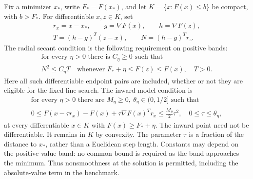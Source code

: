 Fix a minimizer $x_*$, write $F_*=F(x_*)$, and let
$K=\{x:F(x)\le b\}$ be compact, with $b>F_*$. For differentiable $x,z\in K$,
set
\[
 \begin{gathered}
 r_x=x-x_*,\qquad g=\nabla F(x),\qquad h=\nabla F(z),\\
 T=(h-g)^T(z-x),\qquad N=(h-g)^Tr_z.
 \end{gathered}
\]
The radial secant condition is the following requirement on positive bands:
\begin{equation}\label{art:radial-condition}
 \begin{gathered}
 \text{for every }\eta>0\text{ there is }C_\eta\ge0\text{ such that}\\
 N^2\le C_\eta T
 \quad\text{whenever }F_*+\eta\le F(z)\le F(x),\quad T>0.
 \end{gathered}
\end{equation}
Here all such differentiable endpoint pairs are included, whether or not they
are eligible for the fixed line search. The inward model condition is
\begin{equation}\label{art:inward-condition}
 \begin{gathered}
 \text{for every }\eta>0\text{ there are }M_\eta\ge0,
       \ \theta_\eta\in(0,1/2]\text{ such that}\\
 0\le F(x-\tau r_x)-F(x)+\tau\nabla F(x)^Tr_x
       \le\frac{M_\eta}{2}\tau^2,\quad 0\le\tau\le\theta_\eta,
 \end{gathered}
\end{equation}
at every differentiable $x\in K$ with $F(x)\ge F_*+\eta$.
The inward point need not be differentiable. It remains in $K$ by convexity.
The parameter $\tau$ is a fraction of the distance to $x_*$, rather than a
Euclidean step length. Constants may depend on the positive value band:
no common bound is required as the band approaches the minimum. Thus
nonsmoothness at the solution is permitted, including the absolute-value
term in the benchmark.

